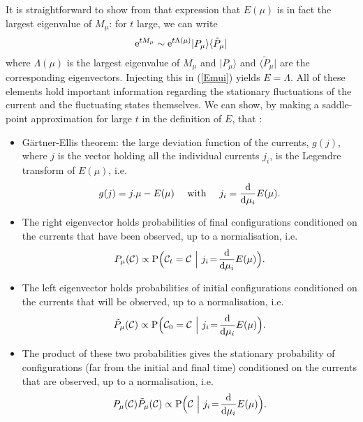 \documentclass[aps,pre,onecolumn,showpacs,showkeys,a4paper]{revtex4-1}
\begin{document}
It is straightforward to show from that expression that $E(\mu)$ is in fact the largest eigenvalue of $M_{\mu}$: for $t$ large, we can write
\begin{equation}
{\rm e}^{tM_{\mu}}\sim {\rm e}^{t\Lambda(\mu)}|P_{\mu}\rangle \langle \tilde{P}_{\mu}|
\end{equation}
where $\Lambda(\mu)$ is the largest eigenvalue of $M_{\mu}$ and $|P_{\mu}\rangle$ and $ \langle \tilde{P}_{\mu}|$ are the corresponding eigenvectors. Injecting this in (\ref{Emui}) yields $E=\Lambda$. All of these elements hold important information regarding the stationary fluctuations of the current and the fluctuating states themselves. We can show, by making a saddle-point approximation for large $t$ in the definition of $E$, that \cite{Touchette20091,Lazarescu2015}:
\begin{itemize}
\item G\"artner-Ellis theorem: the large deviation function of the currents, $g(j)$, where $j$ is the vector holding all the individual currents $j_i$, is the Legendre transform of $E(\mu)$, i.e.
\begin{equation}\label{gEi}
g(j)=j.\mu-E(\mu)~~~~{\rm with}~~~~j_i=\frac{{\rm d}}{{\rm d}\mu_i} E(\mu).
\end{equation}
\item The right eigenvector holds probabilities of final configurations conditioned on the currents that have been observed, up to a normalisation, i.e.
\begin{equation}
P_\mu({\mathcal C})\propto{\rm P}\Bigl({\mathcal C}_t={\mathcal C}~\Big|~j_i\!=\!\frac{{\rm d}}{{\rm d}\mu_i} E(\mu)\Bigr).
\end{equation}
\item The left eigenvector holds probabilities of initial configurations conditioned on the currents that will be observed, up to a normalisation, i.e.
\begin{equation}
\tilde{P}_\mu({\mathcal C})\propto{\rm P}\Bigl({\mathcal C}_0={\mathcal C}~\Big|~j_i\!=\!\frac{{\rm d}}{{\rm d}\mu_i} E(\mu)\Bigr).
\end{equation}
\item The product of these two probabilities gives the stationary probability of configurations (far from the initial and final time) conditioned on the currents that are observed, up to a normalisation, i.e.
\begin{equation}\label{sensemble}
P_\mu({\mathcal C})\tilde{P}_\mu({\mathcal C})\propto{\rm P}\Bigl({\mathcal C}~\Big|~j_i\!=\!\frac{{\rm d}}{{\rm d}\mu_i} E(\mu)\Bigr).
\end{equation}
\end{itemize}
\end{document}
